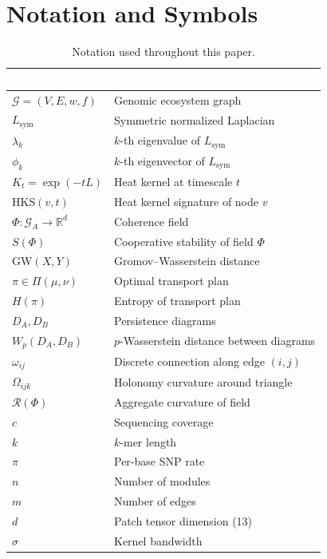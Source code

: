 \documentclass{../yalumba}
\begin{document}
\section{Notation and Symbols}
\label{sec:notation}

\begin{table}[H]
  \centering
  \tablestyle
  \caption{Notation used throughout this paper.}
  \label{tab:notation}
  \begin{tabular}{ll}
    \toprule
    \rowcolor{table-header}
    \textcolor{white}{\textbf{Symbol}} &
    \textcolor{white}{\textbf{Meaning}} \\
    \midrule
    $\mathcal{G} = (V, E, w, f)$ & Genomic ecosystem graph \\
    $L_{\mathrm{sym}}$ & Symmetric normalized Laplacian \\
    $\lambda_k$ & $k$-th eigenvalue of $L_{\mathrm{sym}}$ \\
    $\phi_k$ & $k$-th eigenvector of $L_{\mathrm{sym}}$ \\
    $K_t = \exp(-tL)$ & Heat kernel at timescale $t$ \\
    $\mathrm{HKS}(v, t)$ & Heat kernel signature of node $v$ \\
    $\Phi: \mathcal{G}_A \to \mathbb{R}^d$ & Coherence field \\
    $S(\Phi)$ & Cooperative stability of field $\Phi$ \\
    $\mathrm{GW}(X, Y)$ & Gromov--Wasserstein distance \\
    $\pi \in \Pi(\mu, \nu)$ & Optimal transport plan \\
    $H(\pi)$ & Entropy of transport plan \\
    $D_A, D_B$ & Persistence diagrams \\
    $W_p(D_A, D_B)$ & $p$-Wasserstein distance between diagrams \\
    $\omega_{ij}$ & Discrete connection along edge $(i,j)$ \\
    $\Omega_{ijk}$ & Holonomy curvature around triangle \\
    $\mathcal{R}(\Phi)$ & Aggregate curvature of field \\
    $c$ & Sequencing coverage \\
    $k$ & $k$-mer length \\
    $\pi$ & Per-base SNP rate \\
    $n$ & Number of modules \\
    $m$ & Number of edges \\
    $d$ & Patch tensor dimension (13) \\
    $\sigma$ & Kernel bandwidth \\
    \bottomrule
  \end{tabular}
\end{table}




\end{document}
